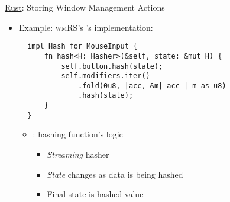 \begin{frame}[fragile]{\underline{Rust}: Storing Window Management Actions \hfill {\footnotesize \currentname}}


    \begin{itemize}

        \item Example: \textsc{wmRS}'s 's  implementation:\\[3pt] 
\begin{verbatim}
  impl Hash for MouseInput {
      fn hash<H: Hasher>(&self, state: &mut H) {
          self.button.hash(state);
          self.modifiers.iter()
              .fold(0u8, |acc, &m| acc | m as u8)
              .hash(state);
      }
  }
\end{verbatim}

    \vspace*{5pt}\begin{itemize}

        \item {}: hashing function's logic
            \begin{itemize}
                \item \textit{Streaming} hasher
                \item \textit{State} changes as data is being hashed
                \item Final state is hashed value
            \end{itemize}

    \end{itemize}

    \end{itemize}

    \vfill

\end{frame}

